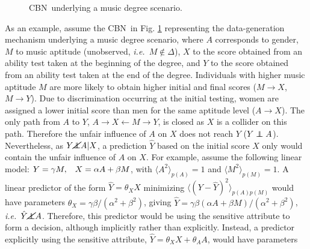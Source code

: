 \documentclass[runningheads]{llncs}
\newcommand{\figref}[1]{Fig. \ref{#1}}
\newcommand\independent{\protect\mathpalette{\protect\independenT}{\perp}}
\def\independenT#1#2{\mathrel{\rlap{$#1#2$}\mkern2mu{#1#2}}}
\newcommand{\av}[1]{\langle #1 \rangle}
\newcommand{\ie}{\emph{i.e.}}
\newcommand{\CBN}{CBN}
\begin{document}
\begin{figure}
\vskip0.1cm
\centering
{}
\vspace{-0.4cm}
\caption{\CBN~underlying a music degree scenario.}
\label{fig:TS}
\end{figure}
\noindent As an example, assume the \CBN~in \figref{fig:TS} representing the data-generation mechanism underlying a music degree scenario, where $A$ corresponds to gender, $M$ to music aptitude (unobserved, \ie~$M\notin \Delta$), $X$ to the score obtained from an ability test taken at the beginning of the degree, and $Y$ to the score obtained from an ability test taken at the end of the degree. Individuals with higher music aptitude $M$ are more likely to obtain higher initial and final scores ($M\rightarrow X$, $M\rightarrow Y$). Due to discrimination occurring at the initial testing, women are assigned a lower initial score than men for the same aptitude level ($A \rightarrow X$). The only path from $A$ to $Y$, $A\rightarrow X \leftarrow M \rightarrow Y$, is closed as $X$ is a collider on this path. Therefore the unfair influence of $A$ on $X$ does not reach $Y$ ($Y\independent A$). Nevertheless, as $Y\cancel{\independent} A |X$, a prediction $\hat Y$ based on the initial score $X$ only would contain the unfair influence of $A$ on $X$. For example, assume the following linear model: $Y=\gamma M, \hskip0.3cm X =\alpha A + \beta M$, with $\av{A^2}_{p(A)}=1$ and $\av{M^2}_{p(M)}=1$. A linear predictor of the form $\hat Y = \theta_X X$ minimizing $\av{(Y-\hat Y)^2}_{p(A)p(M)}$ would have parameters $\theta_X=\gamma\beta/(\alpha^2+\beta^2)$, 
giving $\hat Y = \gamma\beta(\alpha A + \beta M)/(\alpha^2+\beta^2)$, \ie~$\hat Y\cancel{\independent} A$.
Therefore, this predictor would be using the sensitive attribute to form a decision, although implicitly rather than explicitly. Instead, a predictor explicitly using the sensitive attribute, $\hat Y = \theta_X X + \theta_A A$, would have parameters
\end{document}
